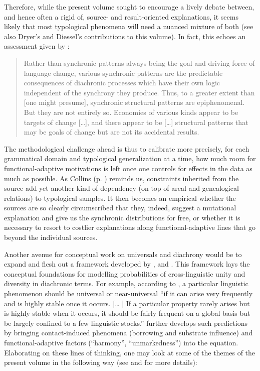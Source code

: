 \documentclass[output=paper]{langsci/langscibook}
\begin{document}
\newpage 
Therefore, while the present volume sought to encourage a lively debate between, and hence often a rigid  of, source- and result-oriented explanations, it seems likely that most typological phenomena will need a nuanced mixture of both (see also Dryer’s and Diessel’s contributions to this volume). In fact, this echoes an assessment given by \citet[287--288]{Nichols2008_Diach}:

\begin{quote}
Rather than synchronic patterns always being the goal and driving force of language change, various synchronic patterns are the predictable consequences of diachronic processes which have their own logic independent of the synchrony they produce. Thus, to a greater extent than [one might presume], synchronic structural patterns are epiphenomenal. But they are not entirely so. Economies of various kinds appear to be targets of change […], and there appear to be […] structural patterns that may be goals of change but are not its accidental results.
\end{quote}

The methodological challenge ahead is thus to calibrate more precisely, for each grammatical domain and typological generalization at a time, how much room for functional-adaptive motivations is left once one controls for  effects in the data as much as possible. As Collins (p. \pageref{p:collins:dependency}) reminds us, constraints inherited from the source add yet another kind of dependency (on top of areal and genealogical relations) to typological samples. It then becomes an empirical  whether the sources are so clearly circumscribed that they, indeed, suggest a mutational explanation and give us the synchronic distributions for free, or whether it is necessary to resort to costlier explanations along functional-adaptive lines that go beyond the individual sources.

Another avenue for conceptual work on universals and diachrony would be to expand and flesh out a framework developed by \citet{Greenberg1978_Diachr}, \citet{Nichols1992,Nichols2003} and \citet{Bickel2013}. This framework lays the conceptual foundations for modelling probabilities of cross-linguistic unity and diversity in diachronic terms. For example, according to \citet[76]{Greenberg1978_Diachr}, a particular linguistic phenomenon should be universal or near-universal “if it can arise very frequently and is highly stable once it occurs. [… ] If a particular property rarely arises but is highly stable when it occurs, it should be fairly frequent on a global basis but be largely confined to a few linguistic stocks.” \citet[287--288]{Nichols2008_Diach} further develops such predictions by bringing contact-induced phenomena (borrowing and substrate influence) and functional-adaptive factors (“harmony”, “unmarkedness”) into the equation. Elaborating on these lines of thinking, one may look at some of the themes of the present volume in the following way (see \citealt{Grossman2016} and \citealt{GrossmanEtAl2018} for more details):
\end{document}
